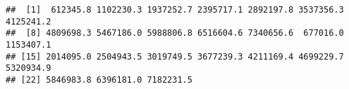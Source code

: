 \documentclass[
]{article}
\begin{document}
\begin{verbatim}
##  [1]  612345.8 1102230.3 1937252.7 2395717.1 2892197.8 3537356.3 4125241.2
##  [8] 4809698.3 5467186.0 5988806.8 6516604.6 7340656.6  677016.0 1153407.1
## [15] 2014095.0 2504943.5 3019749.5 3677239.3 4211169.4 4699229.7 5320934.9
## [22] 5846983.8 6396181.0 7182231.5
\end{verbatim}
\end{document}
